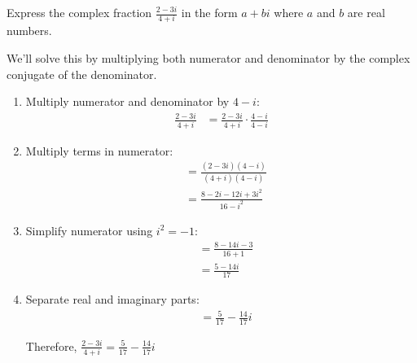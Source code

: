 \exampleline
\begin{example}
Express the complex fraction $\frac{2-3i}{4+i}$ in the form $a + bi$ where $a$ and $b$ are real numbers.

\begin{solution}
We'll solve this by multiplying both numerator and denominator by the complex conjugate of the denominator.

\begin{enumerate}
\item Multiply numerator and denominator by $4-i$:
   \begin{align*}
   \frac{2-3i}{4+i} &= \frac{2-3i}{4+i} \cdot \frac{4-i}{4-i}
   \end{align*}

\item Multiply terms in numerator:
   \begin{align*}
   &= \frac{(2-3i)(4-i)}{(4+i)(4-i)} \\
   &= \frac{8-2i-12i+3i^2}{16-i^2}
   \end{align*}

\item Simplify numerator using $i^2=-1$:
   \begin{align*}
   &= \frac{8-14i-3}{16+1} \\
   &= \frac{5-14i}{17}
   \end{align*}

\item Separate real and imaginary parts:
   \begin{align*}
   &= \frac{5}{17} - \frac{14}{17}i
   \end{align*}

Therefore, $\frac{2-3i}{4+i} = \frac{5}{17} - \frac{14}{17}i$
\end{enumerate}
\end{solution}
\end{example}
\exampleline
